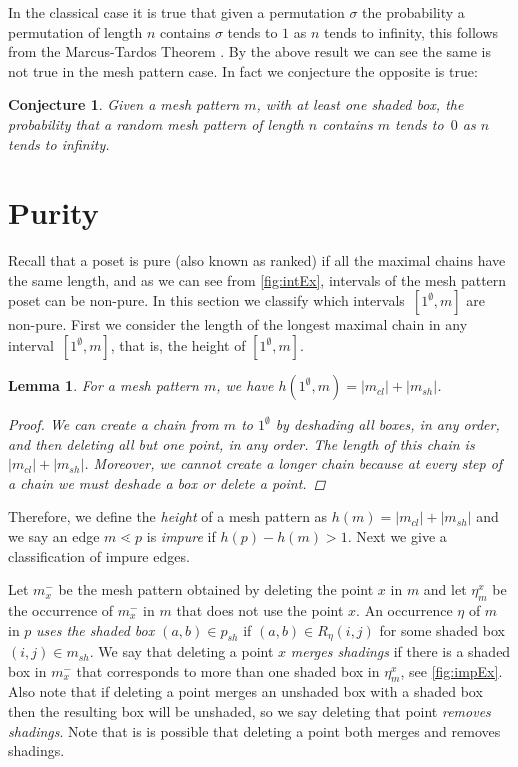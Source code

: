 \documentclass[preprint,11pt]{elsarticle}
\newtheorem{lem}[thm]{Lemma}\crefname{lem}{Lemma}{Lemmas}
\newtheorem{conj}[thm]{Conjecture}\crefname{conj}{Conjecture}{Conjectures}
\newcommand\cl[1]{#1_{cl}}
\newcommand\sh[1]{#1_{sh}}
\newcommand\occX[2]{\eta^{#2}_{#1}}
\newcommand\mX[2]{#1^{-}_{#2}}
\newcommand\h{h}
\numberwithin{equation}{section}
\numberwithin{figure}{section}
\numberwithin{thm}{section}
\begin{document}
In the classical case it is true that given a permutation $\sigma$ the
probability a permutation of length $n$ contains $\sigma$ tends to $1$ as $n$
tends to infinity, this follows from the Marcus-Tardos Theorem \cite{MT04}. By
the above result we can see the same is not true in the mesh pattern case. In
fact we conjecture the opposite is true:

\begin{conj}
Given a mesh pattern $m$, with at least one shaded box, the probability that a random mesh pattern of length
$n$ contains $m$ tends to~$0$ as $n$ tends to infinity.
\end{conj}




\section{Purity}\label{sec:purity}
Recall that a poset is pure (also known as ranked) if all the maximal chains have the same length, and as we
can see from \cref{fig:intEx}, intervals of the mesh pattern poset can be non-pure. In this section we classify
which intervals~$[1^\emptyset,m]$ are non-pure. First we consider the length of the longest maximal chain in
any interval~$[1^\emptyset,m]$, that is, the height of $[1^\emptyset,m]$.

\begin{lem}
For a mesh pattern $m$, we have $\h(1^\emptyset,m)=|\cl{m}|+|\sh{m}|$.
\begin{proof}
We can create a chain from $m$ to $1^\emptyset$ by deshading all boxes, in any order,
and then deleting all but one point, in any order. The length of this chain is $|\cl{m}|+|\sh{m}|$.
Moreover, we cannot create a longer chain because at every
step of a chain we must deshade a box or delete a point.
\end{proof}
\end{lem}

Therefore, we define the \emph{height} of a mesh pattern as $\h(m)=|\cl{m}|+|\sh{m}|$ and we say an
edge $m\lessdot p$ is \emph{impure} if $\h(p)-\h(m)>1$.
Next we give a classification of impure edges.

 Let $\mX{m}{x}$ be the mesh pattern obtained by deleting the
point $x$ in $m$ and let $\occX{m}{x}$ be the occurrence of $\mX{m}{x}$ in $m$ that does not
use the point $x$. An occurrence $\eta$ of $m$ in $p$ \emph{uses the shaded box $(a,b)\in\sh{p}$}
if $(a,b)\in R_\eta(i,j)$ for some shaded box $(i,j)\in\sh{m}$. We say that
deleting a point $x$ \emph{merges shadings} if
there is a shaded box in $\mX{m}{x}$ that corresponds to more than one shaded box in
$\occX{m}{x}$, see \cref{fig:impEx}. Also note that if deleting a point merges an unshaded box with a
shaded box then the resulting box will be unshaded, so we say deleting that point \emph{removes shadings}.
Note that is is possible that deleting a point both merges and removes shadings.
\end{document}
